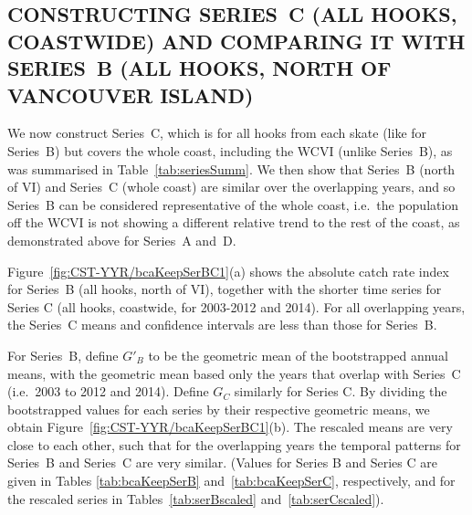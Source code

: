 

\clearpage


\subsection{CONSTRUCTING SERIES~C (ALL HOOKS, COASTWIDE) AND COMPARING IT WITH SERIES~B (ALL HOOKS, NORTH OF VANCOUVER ISLAND)}\label{sec:compareBC}


We now construct Series~C, which is for all hooks from each skate (like for
Series~B) but covers the whole coast, including the WCVI (unlike Series~B), as
was summarised in Table~\ref{tab:seriesSumm}. We then show that Series~B (north
of VI) and Series~C (whole coast) are similar over the overlapping years, and so
Series~B can be considered representative of the whole coast, i.e.~the
population off the WCVI is not showing a different relative trend to the rest of
the coast, as demonstrated above for Series~A
and~D. %

Figure~\ref{fig:CST-YYR/bcaKeepSerBC1}(a) shows the absolute catch rate index
for Series~B (all hooks, north of VI), together with the shorter time series for
Series C (all hooks, coastwide, for 2003-2012 and 2014). For all overlapping
years, the Series~C means and confidence intervals are less than those for
Series~B.

For Series~B, define $G'_{B}$ to be the geometric mean of the bootstrapped
annual means, with the geometric mean based only the years that overlap with
Series~C (i.e.~2003 to 2012 and 2014). Define $G_C$ similarly for Series C. By
dividing the bootstrapped values for each series by their respective geometric
means, we obtain Figure~\ref{fig:CST-YYR/bcaKeepSerBC1}(b). The rescaled means
are very close to each other, such that for the overlapping years the temporal
patterns for Series~B and Series~C are very similar. (Values for Series B and
Series C are given in Tables \ref{tab:bcaKeepSerB} and~\ref{tab:bcaKeepSerC},
respectively, and for the rescaled series in Tables~\ref{tab:serBscaled}
and~\ref{tab:serCscaled}).

